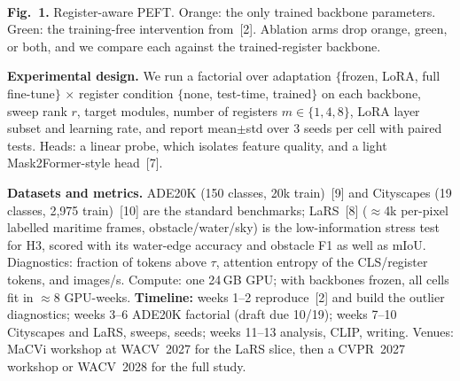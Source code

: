 \documentclass[10pt]{article}
\begin{document}
\begin{center}
\\[-4pt]
{\scriptsize\textbf{Fig.~1.} Register-aware PEFT. Orange: the only trained backbone parameters. Green: the training-free intervention from~[2]. Ablation arms drop orange, green, or both, and we compare each against the trained-register backbone.}
\end{center}
\vspace{-6pt}

\textbf{Experimental design.} We run a factorial over adaptation $\{$frozen, LoRA, full fine-tune$\}$ $\times$ register condition $\{$none, test-time, trained$\}$ on each backbone, sweep rank $r$, target modules, number of registers $m\in\{1,4,8\}$, LoRA layer subset and learning rate, and report mean$\pm$std over 3 seeds per cell with paired tests. Heads: a linear probe, which isolates feature quality, and a light Mask2Former-style head~[7].

\textbf{Datasets and metrics.} ADE20K (150 classes, 20k train)~[9] and Cityscapes (19 classes, 2,975 train)~[10] are the standard benchmarks; LaRS~[8] ($\approx$4k per-pixel labelled maritime frames, obstacle/water/sky) is the low-information stress test for H3, scored with its water-edge accuracy and obstacle F1 as well as mIoU. Diagnostics: fraction of tokens above $\tau$, attention entropy of the CLS/register tokens, and images/s. Compute: one 24\,GB GPU; with backbones frozen, all cells fit in $\approx$8 GPU-weeks. \textbf{Timeline:} weeks 1--2 reproduce~[2] and build the outlier diagnostics; weeks 3--6 ADE20K factorial (draft due 10/19); weeks 7--10 Cityscapes and LaRS, sweeps, seeds; weeks 11--13 analysis, CLIP, writing. Venues: MaCVi workshop at WACV~2027 for the LaRS slice, then a CVPR~2027 workshop or WACV~2028 for the full study.
\end{document}
